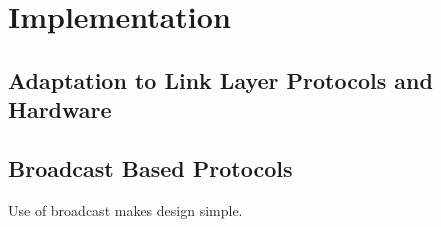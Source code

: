\section{Implementation}

\subsection{Adaptation to Link Layer Protocols and Hardware}
\subsection{Broadcast Based Protocols}
Use of broadcast makes design simple.